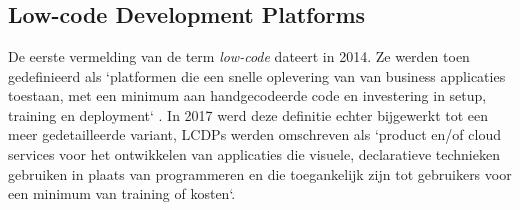\chapter{}%
\label{ch:stand-van-zaken}





\section{Low-code Development Platforms}



De eerste vermelding van de term \textit{low-code} dateert in 2014. Ze werden toen gedefinieerd als `platformen die een snelle oplevering van van business applicaties toestaan, met een minimum aan handgecodeerde code en investering in setup, training en deployment` \autocite{Ruscio2022}. In 2017 werd deze definitie echter bijgewerkt tot een meer gedetailleerde variant, LCDPs werden omschreven als `product en/of cloud services voor het ontwikkelen van applicaties die visuele, declaratieve technieken gebruiken in plaats van programmeren en die toegankelijk zijn tot gebruikers voor een minimum van training of kosten`. 

